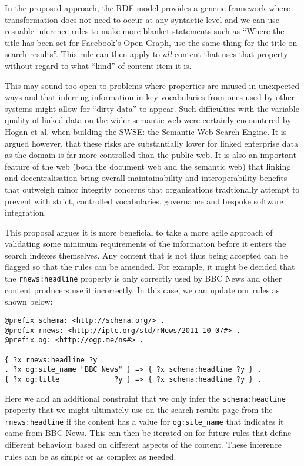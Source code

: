 In the proposed approach, the RDF model provides a generic framework where
transformation does not need to occur at any syntactic level and we
can use resuable inference rules to make more blanket statements such as
``Where the title has been set for Facebook's Open Graph, use the same
thing for the title on search results''. This rule can then apply to \emph{all}
content that uses that property without regard to what ``kind'' of content item
it is.

This may sound too open to problems where properties are miused in
unexpected ways and that inferring information in key vocabularies from
ones used by other systems might allow for ``dirty data'' to appear. Such
difficulties with the variable quality of linked data on the wider semantic
web were certainly encountered by Hogan et al.\cite{hogan2011searching} when
building the SWSE: the Semantic Web Search Engine. It is argued however,
that these risks are substantially lower for linked enterprise data as
the domain is far more controlled than the public web. It is also an important
feature of the web (both the document web and the semantic web) that linking and
decentralisation bring overall maintainability and interoperability benefits
that outweigh minor integrity concerns that organisations tradtionally attempt
to prevent with strict, controlled vocabularies, governance and bespoke
software integration.

This proposal argues it is more beneficial to take a more agile approach
of validating some minimum requirements of the information before it
enters the search indexes themselves. Any content that is not thus
being accepted can be flagged so that the rules can be amended. For example,
it might be decided that the \texttt{rnews:headline} property is only
correctly used by BBC News and other content producers use it incorrectly. In
this case, we can update our rules as shown below:

\begin{centering}
\begin{lstlisting}[language=ttl]
@prefix schema: <http://schema.org/> .
@prefix rnews: <http://iptc.org/std/rNews/2011-10-07#> .
@prefix og: <http://ogp.me/ns#> .

{ ?x rnews:headline ?y
. ?x og:site_name "BBC News" } => { ?x schema:headline ?y } .
{ ?x og:title             ?y } => { ?x schema:headline ?y } .
\end{lstlisting}
\end{centering}

Here we add an additional constraint
that we only infer the \texttt{schema:headline} property that we might
ultimately use on the search results page from the \texttt{rnews:headline} if
the content has a value for \texttt{og:site\_name} that indicates it came
from BBC News. This can then be iterated on for future rules that define
different behaviour based on different aspects of the content. These inference
rules can be as simple or as complex as needed.

